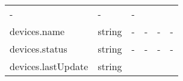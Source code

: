 \documentclass[
]{article}
\begin{document}
\begin{longtable}[]{@{}llllll@{}}
\begin{minipage}[t]{0.14\columnwidth}
-\strut
\end{minipage} & \begin{minipage}[t]{0.14\columnwidth}\raggedright
-\strut
\end{minipage} & \begin{minipage}[t]{0.14\columnwidth}\raggedright
-\strut
\end{minipage}\tabularnewline
\begin{minipage}[t]{0.14\columnwidth}\raggedright
devices.name\strut
\end{minipage} & \begin{minipage}[t]{0.14\columnwidth}\raggedright
string\strut
\end{minipage} & \begin{minipage}[t]{0.14\columnwidth}\raggedright
-\strut
\end{minipage} & \begin{minipage}[t]{0.14\columnwidth}\raggedright
-\strut
\end{minipage} & \begin{minipage}[t]{0.14\columnwidth}\raggedright
-\strut
\end{minipage} & \begin{minipage}[t]{0.14\columnwidth}\raggedright
-\strut
\end{minipage}\tabularnewline
\begin{minipage}[t]{0.14\columnwidth}\raggedright
devices.status\strut
\end{minipage} & \begin{minipage}[t]{0.14\columnwidth}\raggedright
string\strut
\end{minipage} & \begin{minipage}[t]{0.14\columnwidth}\raggedright
-\strut
\end{minipage} & \begin{minipage}[t]{0.14\columnwidth}\raggedright
-\strut
\end{minipage} & \begin{minipage}[t]{0.14\columnwidth}\raggedright
-\strut
\end{minipage} & \begin{minipage}[t]{0.14\columnwidth}\raggedright
-\strut
\end{minipage}\tabularnewline
\begin{minipage}[t]{0.14\columnwidth}\raggedright
devices.lastUpdate\strut
\end{minipage} & \begin{minipage}[t]{0.14\columnwidth}\raggedright
string\strut
\end{minipage} & \begin{minipage}[t]{0.14\columnwidth}\raggedright

\end{minipage}
\end{longtable}
\end{document}
